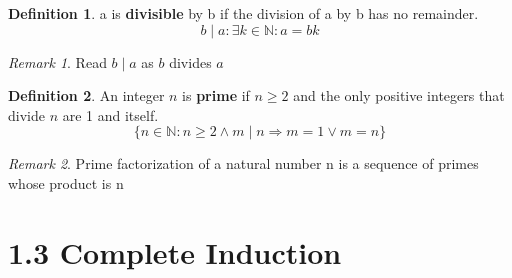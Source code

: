 \documentclass[11pt]{article}
\theoremstyle{plain}%
\theoremstyle{definition}
\newtheorem{defn}{Definition}
\theoremstyle{remark}
\newtheorem*{rem}{Remark}
\begin{document}
\begin{defn}
  \label{divisible}
  a is \textbf{divisible} by b if the division of a by b has no remainder.
  \[
    b \mid a: \exists k\in \mathbb{N}: a = bk
  \]
  \begin{rem}
    Read $b\mid a$ as $b$ divides $a$
  \end{rem}
\end{defn}

\begin{defn}
  \label{prime number}
  An integer $n$ is \textbf{prime} if $n \geq 2$ and the only positive integers that divide $n$ are 1 and itself.
  \[
    \{ n \in\mathbb{N}: n \geq 2 \land m\mid n \Rightarrow m=1 \lor m=n\}
  \]
  \begin{rem}
    Prime factorization of a natural number n is a sequence of primes whose product is n
  \end{rem}
\end{defn}


\section*{1.3 Complete Induction}
\end{document}
